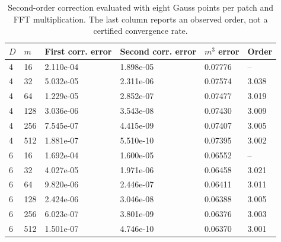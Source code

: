 \begin{table}[htbp]
\centering
\caption{Second-order correction evaluated with eight Gauss points per patch and FFT multiplication. The last column reports an observed order, not a certified convergence rate.}
\label{tab:second_order_convergence}
\begin{tabular}{llllll}
\toprule
$D$ & $m$ & First corr. error & Second corr. error & $m^3$ error & Order \\
\midrule
4 & 16 & 2.110e-04 & 1.898e-05 & 0.07776 & -- \\
4 & 32 & 5.032e-05 & 2.311e-06 & 0.07574 & 3.038 \\
4 & 64 & 1.229e-05 & 2.852e-07 & 0.07477 & 3.019 \\
4 & 128 & 3.036e-06 & 3.543e-08 & 0.07430 & 3.009 \\
4 & 256 & 7.545e-07 & 4.415e-09 & 0.07407 & 3.005 \\
4 & 512 & 1.881e-07 & 5.510e-10 & 0.07395 & 3.002 \\
6 & 16 & 1.692e-04 & 1.600e-05 & 0.06552 & -- \\
6 & 32 & 4.027e-05 & 1.971e-06 & 0.06458 & 3.021 \\
6 & 64 & 9.820e-06 & 2.446e-07 & 0.06411 & 3.011 \\
6 & 128 & 2.424e-06 & 3.046e-08 & 0.06388 & 3.005 \\
6 & 256 & 6.023e-07 & 3.801e-09 & 0.06376 & 3.003 \\
6 & 512 & 1.501e-07 & 4.746e-10 & 0.06370 & 3.001 \\
\bottomrule
\end{tabular}
\end{table}
